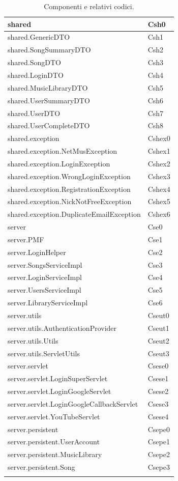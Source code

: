 \begin{footnotesize}
\begin{longtable}[!h]{|l|l|}
shared & Csh0\\\hline
shared.GenericDTO & Csh1\\\hline
shared.SongSummaryDTO & Csh2\\\hline
shared.SongDTO & Csh3\\\hline
shared.LoginDTO & Csh4\\\hline
shared.MusicLibraryDTO & Csh5\\\hline
shared.UserSummaryDTO & Csh6\\\hline
shared.UserDTO & Csh7\\\hline
shared.UserCompleteDTO & Csh8\\\hline
shared.exception & Cshex0\\\hline
shared.exception.NetMusException & Cshex1\\\hline
shared.exception.LoginException & Cshex2\\\hline
shared.exception.WrongLoginException & Cshex3\\\hline
shared.exception.RegistrationException & Cshex4\\\hline
shared.exception.NickNotFreeException & Cshex5\\\hline
shared.exception.DuplicateEmailException & Cshex6\\\hline
server & Cse0\\\hline
server.PMF & Cse1\\\hline
server.LoginHelper & Cse2\\\hline
server.SongsServiceImpl & Cse3\\\hline
server.LoginServiceImpl & Cse4\\\hline
server.UsersServiceImpl & Cse5\\\hline
server.LibraryServiceImpl & Cse6\\\hline
server.utils & Cseut0\\\hline
server.utils.AuthenticationProvider & Cseut1\\\hline
server.utils.Utils & Cseut2\\\hline
server.utils.ServletUtils & Cseut3\\\hline
server.servlet & Csese0\\\hline
server.servlet.LoginSuperServlet & Csese1\\\hline
server.servlet.LoginGoogleServlet & Csese2\\\hline
server.servlet.LoginGoogleCallbackServlet & Csese3\\\hline
server.servlet.YouTubeServlet & Csese4\\\hline
server.persistent & Csepe0\\\hline
server.persistent.UserAccount & Csepe1\\\hline
server.persistent.MusicLibrary & Csepe2\\\hline
server.persistent.Song & Csepe3\\\hline
\caption{Componenti e relativi codici.}
\end{longtable}
\end{footnotesize}

